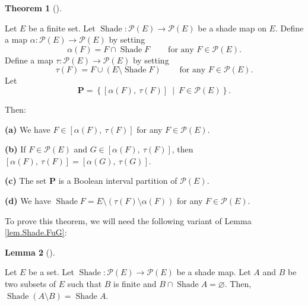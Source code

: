\documentclass[numbers=enddot,12pt,final,onecolumn]{scrartcl}%
\theoremstyle{definition}
\newtheorem{theo}{Theorem}[section]
\newenvironment{theorem}[1][]
{\begin{theo}[#1]\begin{leftbar}}
{\end{leftbar}\end{theo}}
\newtheorem{lem}[theo]{Lemma}
\newenvironment{lemma}[1][]
{\begin{lem}[#1]\begin{leftbar}}
{\end{leftbar}\end{lem}}
\begin{document}
\begin{theorem}
\label{thm.bip.Shade-to-Bip}Let $E$ be a finite set. Let
$\operatorname*{Shade}:\mathcal{P}\left(  E\right)  \rightarrow\mathcal{P}%
\left(  E\right)  $ be a shade map on $E$. Define a map $\alpha:\mathcal{P}%
\left(  E\right)  \rightarrow\mathcal{P}\left(  E\right)  $ by setting%
\[
\alpha\left(  F\right)  =F\cap\operatorname*{Shade}%
F\ \ \ \ \ \ \ \ \ \ \text{for any }F\in\mathcal{P}\left(  E\right)  .
\]
Define a map $\tau:\mathcal{P}\left(  E\right)  \rightarrow\mathcal{P}\left(
E\right)  $ by setting%
\[
\tau\left(  F\right)  =F\cup\left(  E\setminus\operatorname*{Shade}F\right)
\ \ \ \ \ \ \ \ \ \ \text{for any }F\in\mathcal{P}\left(  E\right)  .
\]
Let
\begin{equation}
\mathbf{P}=\left\{  \left[  \alpha\left(  F\right)  ,\ \tau\left(  F\right)
\right]  \ \mid\ F\in\mathcal{P}\left(  E\right)  \right\}  .
\label{eq.thm.bip.Shade-to-Bip.P=}%
\end{equation}


Then:

\textbf{(a)} We have $F\in\left[  \alpha\left(  F\right)  ,\ \tau\left(
F\right)  \right]  $ for any $F\in\mathcal{P}\left(  E\right)  $.

\textbf{(b)} If $F\in\mathcal{P}\left(  E\right)  $ and $G\in\left[
\alpha\left(  F\right)  ,\ \tau\left(  F\right)  \right]  $, then $\left[
\alpha\left(  F\right)  ,\ \tau\left(  F\right)  \right]  =\left[
\alpha\left(  G\right)  ,\ \tau\left(  G\right)  \right]  $.

\textbf{(c)} The set $\mathbf{P}$ is a Boolean interval partition of
$\mathcal{P}\left(  E\right)  $.

\textbf{(d)} We have $\operatorname*{Shade}F=E\setminus\left(  \tau\left(
F\right)  \setminus\alpha\left(  F\right)  \right)  $ for any $F\in
\mathcal{P}\left(  E\right)  $.
\end{theorem}

To prove this theorem, we will need the following variant of Lemma
\ref{lem.Shade.FuG}:

\begin{lemma}
\label{lem.Shade.FoG}Let $E$ be a set. Let $\operatorname*{Shade}%
:\mathcal{P}\left(  E\right)  \rightarrow\mathcal{P}\left(  E\right)  $ be a
shade map. Let $A$ and $B$ be two subsets of $E$ such that $B$ is finite and
$B\cap\operatorname*{Shade}A=\varnothing$. Then, $\operatorname*{Shade}\left(
A\setminus B\right)  =\operatorname*{Shade}A$.
\end{lemma}
\end{document}
